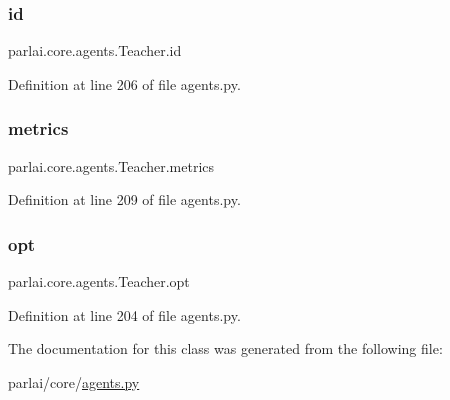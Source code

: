 \subsubsection{\texorpdfstring{id}{id}}
{\footnotesize\ttfamily parlai.\+core.\+agents.\+Teacher.\+id}



Definition at line 206 of file agents.\+py.

\mbox{\label{classparlai_1_1core_1_1agents_1_1Teacher_a159705efe2a9f389d8adfdad76891f08}} 
\subsubsection{\texorpdfstring{metrics}{metrics}}
{\footnotesize\ttfamily parlai.\+core.\+agents.\+Teacher.\+metrics}



Definition at line 209 of file agents.\+py.

\mbox{\label{classparlai_1_1core_1_1agents_1_1Teacher_a3ce6243860ce978a897922863ed32fa4}} 
\subsubsection{\texorpdfstring{opt}{opt}}
{\footnotesize\ttfamily parlai.\+core.\+agents.\+Teacher.\+opt}



Definition at line 204 of file agents.\+py.



The documentation for this class was generated from the following file\+:\begin{DoxyCompactItemize}
\item 
parlai/core/\hyperlink{parlai_2core_2agents_8py}{agents.\+py}\end{DoxyCompactItemize}
